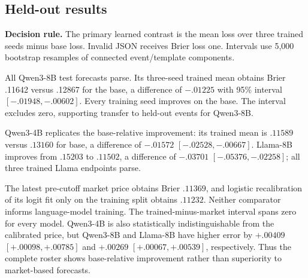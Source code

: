 \subsection{Held-out results}
\label{app:exp3b-results}
\noindent\textbf{Decision rule.}
The primary learned contrast is the mean loss over three trained seeds minus base
loss. Invalid JSON receives Brier loss one. Intervals use 5,000 bootstrap
resamples of connected event/template components.

All Qwen3-8B test forecasts parse. Its three-seed trained mean obtains Brier
.11642 versus .12867 for the base, a difference of $-.01225$ with 95\% interval
$[-.01948,-.00602]$. Every training seed improves on the base. The interval
excludes zero, supporting transfer to held-out events for Qwen3-8B.

\begin{center}
\begin{minipage}{.94\linewidth}
\centering
{}
\label{tab:exp4-endpoint-results}
\scriptsize
\setlength{\tabcolsep}{3.5pt}
\resizebox{\linewidth}{!}{}
\end{minipage}
\end{center}

\begin{center}
\begin{minipage}{.9\linewidth}
\centering
{}
\label{tab:exp3b-model-roster-results}
\scriptsize
\setlength{\tabcolsep}{3.5pt}
\resizebox{\linewidth}{!}{%

}
\end{minipage}
\end{center}

Qwen3-4B replicates the base-relative improvement: its trained mean is $.11589$
versus $.13160$ for base, a difference of $-.01572$
$[-.02528,-.00667]$. Llama-8B improves from $.15203$ to $.11502$, a difference
of $-.03701$ $[-.05376,-.02258]$; all three trained Llama endpoints parse.

The latest pre-cutoff market price obtains Brier $.11369$, and logistic
recalibration of its logit fit only on the training split obtains $.11232$.
Neither comparator informs language-model training. The trained-minus-market
interval spans zero for every model. Qwen3-4B is also statistically
indistinguishable from the calibrated price, but Qwen3-8B and Llama-8B have
higher error by $+.00409$ $[+.00098,+.00785]$ and $+.00269$
$[+.00067,+.00539]$, respectively. Thus the complete roster shows
base-relative improvement rather than superiority to market-based forecasts.

